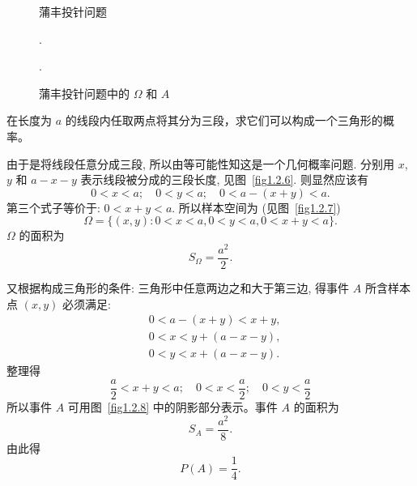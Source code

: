 \begin{figure}
    \centering
    \begin{minipage}[b]{0.5\linewidth}
        \centering
        \caption{蒲丰投针问题}.
        \label{fig1.2.4}
    \end{minipage}
    \begin{minipage}[b]{0.5\linewidth}
        \centering
        \caption{蒲丰投针问题中的 $\Omega$ 和 $A$}.
        \label{fig1.2.5}
    \end{minipage}
\end{figure}

\begin{example}
    在长度为 $a$ 的线段内任取两点将其分为三段，求它们可以构成一个三角形的概率。
\end{example}

\begin{solution}
    由于是将线段任意分成三段,
    所以由等可能性知这是一个几何概率问题.
    分别用 $x$, $y$ 和 $a - x - y$ 表示线段被分成的三段长度,
    见图~\ref{fig1.2.6}.
    则显然应该有
    \[
        0 < x < a; \quad 0 < y < a; \quad 0 < a - (x + y) < a.
    \]
    第三个式子等价于:
    $0 < x + y < a$.
    所以样本空间为 (见图~\ref{fig1.2.7})
    \[
        \Omega = \{(x, y): 0 < x < a, 0 < y < a, 0 < x + y < a\}.
    \]
    $\Omega$ 的面积为
    \[
        S _\Omega = \frac{a^2}{2}.
    \]

    又根据构成三角形的条件:
    三角形中任意两边之和大于第三边,
    得事件 $A$ 所含样本点 $(x,y)$ 必须满足:
    \begin{align*}
         & 0 < a - (x + y) < x + y, \\
         & 0 < x < y + (a - x - y), \\
         & 0 < y < x + (a - x - y).
    \end{align*}
    整理得
    \[ \frac{a}{2} < x + y < a;\quad 0 < x < \frac{a}{2}; \quad 0 < y < \frac{a}{2} \]
    所以事件 $A$ 可用图~\ref{fig1.2.8} 中的阴影部分表示。事件 $A$ 的面积为
    \[ S _A = \frac{a^2}{8}. \]
    由此得
    \[P (A) = \frac{1}{4}. \]
\end{solution}

